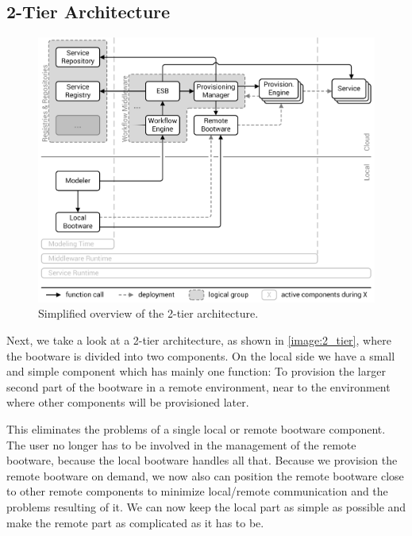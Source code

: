 \subsection{2-Tier Architecture}
\label{design:division:2tier}

\begin{figure}[!htbp]
	\centering
	\includegraphics[resolution=600]{design/assets/2_tier}
	\caption{Simplified overview of the 2-tier architecture.}
	\label{image:2_tier}
\end{figure}

Next, we take a look at a 2-tier architecture, as shown in \autoref{image:2_tier}, where the bootware is divided into two components.
On the local side we have a small and simple component which has mainly one function: To provision the larger second part of the bootware in a remote environment, near to the environment where other components will be provisioned later.

This eliminates the problems of a single local or remote bootware component.
The user no longer has to be involved in the management of the remote bootware, because the local bootware handles all that.
Because we provision the remote bootware on demand, we now also can position the remote bootware close to other remote components to minimize local/remote communication and the problems resulting of it.
We can now keep the local part as simple as possible and make the remote part as complicated as it has to be.

